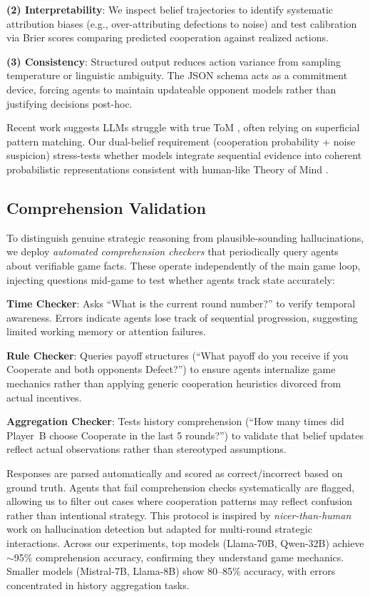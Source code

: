 \documentclass{uai2026} %
\begin{document}
\textbf{(2) Interpretability}: We inspect belief trajectories to identify systematic attribution biases (e.g., over-attributing defections to noise) and test calibration via Brier scores comparing predicted cooperation against realized actions.

\textbf{(3) Consistency}: Structured output reduces action variance from sampling temperature or linguistic ambiguity. The JSON schema acts as a commitment device, forcing agents to maintain updateable opponent models rather than justifying decisions post-hoc.

Recent work suggests LLMs struggle with true ToM \citep{sap2022neural,gandhi2023understanding}, often relying on superficial pattern matching. Our dual-belief requirement (cooperation probability + noise suspicion) stress-tests whether models integrate sequential evidence into coherent probabilistic representations consistent with human-like Theory of Mind \citep{baker2017rational}.

\subsection{Comprehension Validation}

To distinguish genuine strategic reasoning from plausible-sounding hallucinations, we deploy \textit{automated comprehension checkers} that periodically query agents about verifiable game facts. These operate independently of the main game loop, injecting questions mid-game to test whether agents track state accurately:

\textbf{Time Checker}: Asks ``What is the current round number?'' to verify temporal awareness. Errors indicate agents lose track of sequential progression, suggesting limited working memory or attention failures.

\textbf{Rule Checker}: Queries payoff structures (``What payoff do you receive if you Cooperate and both opponents Defect?'') to ensure agents internalize game mechanics rather than applying generic cooperation heuristics divorced from actual incentives.

\textbf{Aggregation Checker}: Tests history comprehension (``How many times did Player~B choose Cooperate in the last 5 rounds?'') to validate that belief updates reflect actual observations rather than stereotyped assumptions.

Responses are parsed automatically and scored as correct/incorrect based on ground truth. Agents that fail comprehension checks systematically are flagged, allowing us to filter out cases where cooperation patterns may reflect confusion rather than intentional strategy. This protocol is inspired by \textit{nicer-than-human} work on hallucination detection \citep{akata2023playing} but adapted for multi-round strategic interactions. Across our experiments, top models (Llama-70B, Qwen-32B) achieve $\sim$95\% comprehension accuracy, confirming they understand game mechanics. Smaller models (Mistral-7B, Llama-8B) show 80--85\% accuracy, with errors concentrated in history aggregation tasks.
\end{document}
